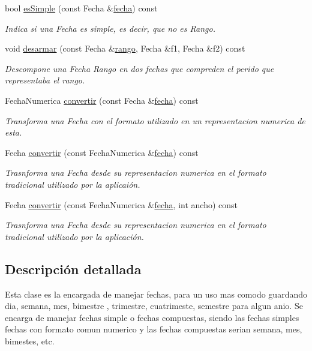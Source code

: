 \begin{DoxyCompactItemize}
bool \hyperlink{classM__Fechas_ada328f6bc5cb26120f4c41197cbf5a51}{es\-Simple} (const \-Fecha \&\hyperlink{classM__Fechas_a9ab0eddea3638aba66d48215c216d91e}{fecha}) const 
\begin{DoxyCompactList}\small\item\em \-Indica si una \-Fecha es simple, es decir, que no es \-Rango. \end{DoxyCompactList}\item 
void \hyperlink{classM__Fechas_a3790e696e581431ab028af5cbd834b96}{desarmar} (const \-Fecha \&\hyperlink{classM__Fechas_a549b5b7c70620d16f24623ab6c0a7ec6}{rango}, \-Fecha \&f1, \-Fecha \&f2) const 
\begin{DoxyCompactList}\small\item\em \-Descompone una \-Fecha \-Rango en dos fechas que compreden el perido que representaba el rango. \end{DoxyCompactList}\item 
\-Fecha\-Numerica \hyperlink{classM__Fechas_a2382b435f48d53cb4957e17b28c8752a}{convertir} (const \-Fecha \&\hyperlink{classM__Fechas_a9ab0eddea3638aba66d48215c216d91e}{fecha}) const 
\begin{DoxyCompactList}\small\item\em \-Transforma una \-Fecha con el formato utilizado en un representacion numerica de esta. \end{DoxyCompactList}\item 
\-Fecha \hyperlink{classM__Fechas_a93212687f09b0a89cc7b9d42bdd7dec8}{convertir} (const \-Fecha\-Numerica \&\hyperlink{classM__Fechas_a9ab0eddea3638aba66d48215c216d91e}{fecha}) const 
\begin{DoxyCompactList}\small\item\em \-Trasnforma una \-Fecha desde su representacion numerica en el formato tradicional utilizado por la aplicaión. \end{DoxyCompactList}\item 
\-Fecha \hyperlink{classM__Fechas_ab6c2daf098d9c539e8a84b146f4651a2}{convertir} (const \-Fecha\-Numerica \&\hyperlink{classM__Fechas_a9ab0eddea3638aba66d48215c216d91e}{fecha}, int ancho) const 
\begin{DoxyCompactList}\small\item\em \-Trasnforma una \-Fecha desde su representacion numerica en el formato tradicional utilizado por la aplicación. \end{DoxyCompactList}\end{DoxyCompactItemize}


\subsection{\-Descripción detallada}
\-Esta clase es la encargada de manejar fechas, para un uso mas comodo guardando dia, semana, mes, bimestre , trimestre, cuatrimeste, semestre para algun anio. \-Se encarga de manejar fechas simple o fechas compuestas, siendo las fechas simples fechas con formato comun numerico y las fechas compuestas serian semana, mes, bimestes, etc. 

